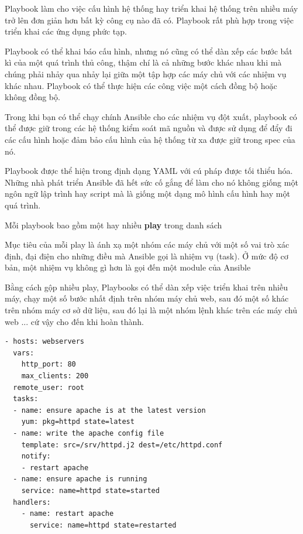 Playbook làm cho việc cấu hình hệ thống hay triển khai hệ thống trên nhiều máy trở lên đơn giản hơn bất kỳ công cụ nào đã có. Playbook rất phù hợp trong việc triển khai các ứng dụng phức tạp.

Playbook có thể khai báo cấu hình, nhưng nó cũng có thể dàn xếp các bước bất kì của một quá trình thủ công, thậm chí là cả những bước khác nhau khi mà chúng phải nhảy qua nhảy lại giữa một tập hợp các máy chủ với các nhiệm vụ khác nhau. Playbook có thể thực hiện các công việc một cách đồng bộ hoặc không đồng bộ.

Trong khi bạn có thể chạy chính Ansible cho các nhiệm vụ đột xuất, playbook có thể được giữ trong các hệ thống kiểm soát mã nguồn và được sử dụng để đẩy đi các cấu hình hoặc đảm bảo cấu hình của hệ thống từ xa được giữ trong spec của nó.

Playbook được thể hiện trong định dạng YAML với cú pháp được tối thiểu hóa. Những nhà phát triển Ansible đã hết sức cố gắng để làm cho nó không giống một ngôn ngữ lập trình hay script mà là giống một dạng mô hình cấu hình hay một quá trình.

Mỗi playbook bao gồm một hay nhiều \textbf{play} trong danh sách

Mục tiêu của mỗi play là ánh xạ một nhóm các máy chủ với một số vai trò xác định, đại điện cho những điều mà Ansible gọi là nhiệm vụ (task). Ở mức độ cơ bản, một nhiệm vụ không gì hơn là gọi đến một module của Ansible

Bằng cách gộp nhiều play, Playbooks có thể dàn xếp việc triển khai trên nhiều máy, chạy một số bước nhất định trên nhóm máy chủ web, sau đó một số khác trên nhóm máy cơ sở dữ liệu, sau đó lại là một nhóm lệnh khác trên các máy chủ web ... cứ vậy cho đến khi hoàn thành.

\begin{lstlisting}[label={lst:ansible_playbook_example},caption={Ví dụ về playbook của Ansible},morekeywords={hosts, vars, tasks, name, yum, http_port, max_clients, remote_user, template, service, handlers, notify, state, pkg, src, dest}]
- hosts: webservers
  vars:
    http_port: 80
    max_clients: 200
  remote_user: root
  tasks:
  - name: ensure apache is at the latest version
    yum: pkg=httpd state=latest
  - name: write the apache config file
    template: src=/srv/httpd.j2 dest=/etc/httpd.conf
    notify:
    - restart apache
  - name: ensure apache is running
    service: name=httpd state=started
  handlers:
    - name: restart apache
      service: name=httpd state=restarted
\end{lstlisting}

